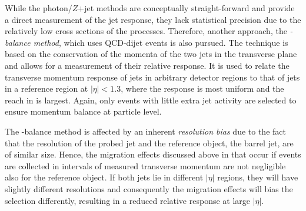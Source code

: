 While the photon/$Z$+jet methods are conceptually straight-forward and provide a direct measurement of the jet response, they lack statistical precision due to the relatively low cross sections of the processes.
Therefore, another approach, the \textit{\pt-balance method}, which uses QCD-dijet events is also pursued.
The technique is based on the conservation of the momenta of the two jets in the transverse plane and allows for a measurement of their relative response.
It is used to relate the transverse momentum response of jets in arbitrary detector regions to that of jets in a reference region at \mbox{$|\eta| < 1.3$}, where the response is most uniform and the reach in \pt is largest.
Again, only events with little extra jet activity are selected to ensure momentum balance at particle level.

The \pt-balance method is affected by an inherent \textit{resolution bias} due to the fact that the resolution of the probed jet and the reference object, the barrel jet, are of similar size.
Hence, the migration effects discussed above in  that occur if events are collected in intervals of measured transverse momentum are not negligible also for the reference object.
If both jets lie in different $|\eta|$ regions, they will have slightly different resolutions and consequently the migration effects will bias the selection differently, resulting in a reduced relative response at large $|\eta|$.


